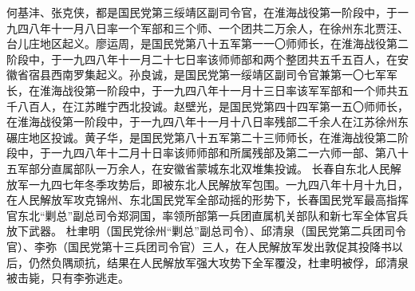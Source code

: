 \begin{maonote}
何基沣、张克侠，都是国民党第三绥靖区副司令官，在淮海战役第一阶段中，于一九四八年十一月八日率一个军部和三个师、一个团共二万余人，在徐州东北贾汪、台儿庄地区起义。廖运周，是国民党第八十五军第一一〇师师长，在淮海战役第二阶段中，于一九四八年十一月二十七日率该师师部和两个整团共五千五百人，在安徽省宿县西南罗集起义。孙良诚，是国民党第一绥靖区副司令官兼第一〇七军军长，在淮海战役第一阶段中，于一九四八年十一月十三日率该军军部和一个师共五千八百人，在江苏睢宁西北投诚。赵壁光，是国民党第四十四军第一五〇师师长，在淮海战役第一阶段中，于一九四八年十一月十八日率残部二千余人在江苏徐州东碾庄地区投诚。黄子华，是国民党第八十五军第二十三师师长，在淮海战役第二阶段中，于一九四八年十二月十日率该师师部和所属残部及第二一六师一部、第八十五军部分直属部队一万余人，在安徽省蒙城东北双堆集投诚。
长春自东北人民解放军一九四七年冬季攻势后，即被东北人民解放军包围。一九四八年十月十九日，在人民解放军攻克锦州、东北国民党军全部动摇的形势下，长春国民党军最高指挥官东北“剿总”副总司令郑洞国，率领所部第一兵团直属机关部队和新七军全体官兵放下武器。
杜聿明（国民党徐州“剿总”副总司令）、邱清泉（国民党第二兵团司令官）、李弥（国民党第十三兵团司令官）三人，在人民解放军发出敦促其投降书以后，仍然负隅顽抗，结果在人民解放军强大攻势下全军覆没，杜聿明被俘，邱清泉被击毙，只有李弥逃走。
\end{maonote}
